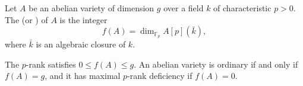 \begin{definition} \label{definition:p_rank_of_abelian_variety_over_a_field_of_characteristic_p}
    Let $A$ be an abelian variety of dimension $g$ over a field $k$ of characteristic $p > 0$. The  (or ) of $A$ is the integer
    $$f(A) = \dim_{\mathbb{F}_p} A[p](\bar{k}),$$
    where $\bar{k}$ is an algebraic closure of $k$.

    The $p$-rank satisfies $0 \leq f(A) \leq g$. An abelian variety is ordinary if and only if $f(A) = g$, and it has maximal $p$-rank deficiency if $f(A) = 0$.
\end{definition}
